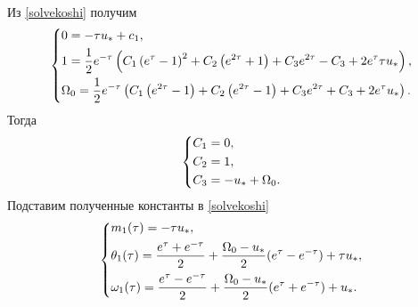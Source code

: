 \documentclass[a4paper,12pt, openany]{book}
\theoremstyle{plain} %
\theoremstyle{definition} %
\theoremstyle{remark} %
\numberwithin{equation}{chapter}
\begin{document}
{Из \eqref{solvekoshi} получим
\[
    \left\{ {\begin{aligned}
                 & 0 = -\tau  u_*+c_1, \hfill                                                            \\
                 & 1 = \frac{1}{2} e^{-\tau } \left(C_1 \left(e^{\tau }-1\right)^2+C_2 \left(e^{2
                \tau }+1\right)+C_3 e^{2 \tau }-C_3+2 e^{\tau } \tau  u_*\right) , \hfill                \\
                 & \Omega_0 = \frac{1}{2} e^{-\tau } \left(C_1 \left(e^{2 \tau }-1\right)+C_2 \left(e^{2
                \tau }-1\right)+C_3 e^{2 \tau }+C_3+2 e^{\tau } u_*\right)  . \hfill                     \\
            \end{aligned}} \right.
\]
Тогда
\[
    \left\{ {\begin{aligned}
                 & C_1 = 0, \hfill             \\
                 & C_2 = 1, \hfill             \\
                 & C_3 = -u_*+\Omega_0. \hfill \\
            \end{aligned}} \right.
\]
Подставим полученные константы в \eqref{solvekoshi}
\[
    \left\{ {\begin{aligned}
                 & m_1(\tau) = -\tau  u_*, \hfill                                                                         \\
                 & \theta_1(\tau) = \frac{e^\tau+e^{-\tau}}{2}+\frac{\Omega_0-u_*}{2}(e^\tau-e^{-\tau})+\tau u_* , \hfill \\
                 & \omega_1(\tau) =\frac{e^\tau-e^{-\tau}}{2}+\frac{\Omega_0-u_*}{2}(e^\tau+e^{-\tau})+u_*   . \hfill     \\
            \end{aligned}} \right.
\]
}
\end{document}
